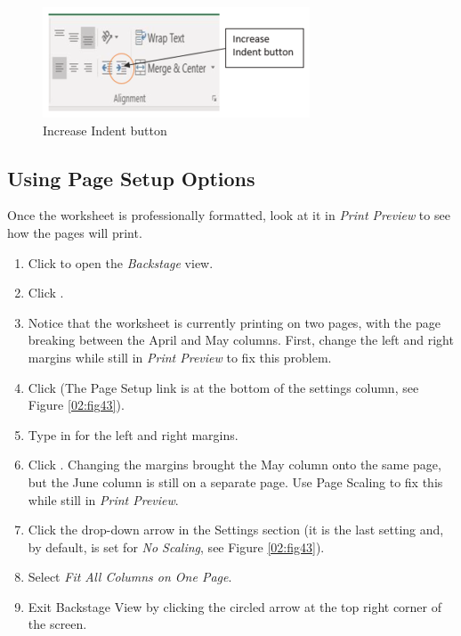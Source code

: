 \begin{figure}[H]
	\centering
	\includegraphics[width=\maxwidth{.95\linewidth}]{gfx/ch02_fig42}
	\caption{Increase Indent button}
	\label{02:fig42}
\end{figure}

\subsection{Using Page Setup Options}

Once the worksheet is professionally formatted, look at it in \textit{Print Preview} to see how the pages will print.

\begin{enumbox}
	\begin{enumerate}
		\item Click  to open the \textit{Backstage} view. 
		\item Click .
		\item Notice that the worksheet is currently printing on two pages, with the page breaking between the April and May columns. First, change the left and right margins while still in \textit{Print Preview} to fix this problem.
		\item Click  (The Page Setup link is at the bottom of the settings column, see Figure \ref{02:fig43}).
		\item Type in  for the left and right  margins.
		\item Click . Changing the margins brought the May column onto the same page, but the June column is still on a separate page. Use Page Scaling to fix this while still in \textit{Print Preview}.
		\item Click the  drop-down arrow in the Settings section (it is the last setting and, by default, is set for \textit{No Scaling}, see Figure \ref{02:fig43}).
		\item Select \textit{Fit All Columns on One Page}.
		\item Exit Backstage View by clicking the circled arrow at the top right corner of the screen.
	\end{enumerate}
\end{enumbox}

